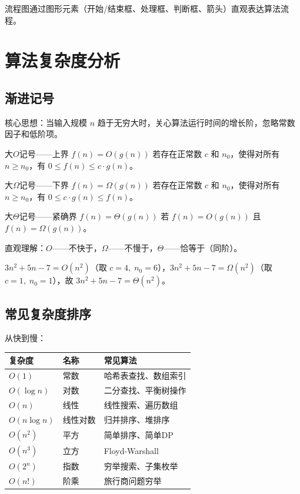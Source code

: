 流程图通过图形元素（开始/结束框、处理框、判断框、箭头）直观表达算法流程。

\section{算法复杂度分析}

\subsection{渐进记号}

核心思想：当输入规模 \(n\) 趋于无穷大时，关心算法运行时间的增长阶，忽略常数因子和低阶项。

\begin{mydefinition}{大\(O\)记号——上界}
\(f(n)=O(g(n))\) 若存在正常数 \(c\) 和 \(n_0\)，使得对所有 \(n\geqslant n_0\)，有 \(0\leqslant f(n)\leqslant c\cdot g(n)\)。
\end{mydefinition}

\begin{mydefinition}{大\(\Omega\)记号——下界}
\(f(n)=\Omega(g(n))\) 若存在正常数 \(c\) 和 \(n_0\)，使得对所有 \(n\geqslant n_0\)，有 \(0\leqslant c\cdot g(n)\leqslant f(n)\)。
\end{mydefinition}

\begin{mydefinition}{大\(\Theta\)记号——紧确界}
\(f(n)=\Theta(g(n))\) 若 \(f(n)=O(g(n))\) 且 \(f(n)=\Omega(g(n))\)。
\end{mydefinition}

直观理解：\(O\)——不快于，\(\Omega\)——不慢于，\(\Theta\)——恰等于（同阶）。

\begin{example}
\(3n^2+5n-7 = O(n^2)\)（取 \(c=4,\;n_0=6\)），\(3n^2+5n-7 = \Omega(n^2)\)（取 \(c=1,\;n_0=1\)），故 \(3n^2+5n-7 = \Theta(n^2)\)。
\end{example}

\subsection{常见复杂度排序}

从快到慢：

\begin{table}[H]
\centering
\begin{tabular}{lll}
\toprule
复杂度 & 名称 & 常见算法 \\
\midrule
\(O(1)\) & 常数 & 哈希表查找、数组索引 \\
\(O(\log n)\) & 对数 & 二分查找、平衡树操作 \\
\(O(n)\) & 线性 & 线性搜索、遍历数组 \\
\(O(n\log n)\) & 线性对数 & 归并排序、堆排序 \\
\(O(n^2)\) & 平方 & 简单排序、简单DP \\
\(O(n^3)\) & 立方 & Floyd-Warshall \\
\(O(2^n)\) & 指数 & 穷举搜索、子集枚举 \\
\(O(n!)\) & 阶乘 & 旅行商问题穷举 \\
\bottomrule
\end{tabular}
\end{table}


